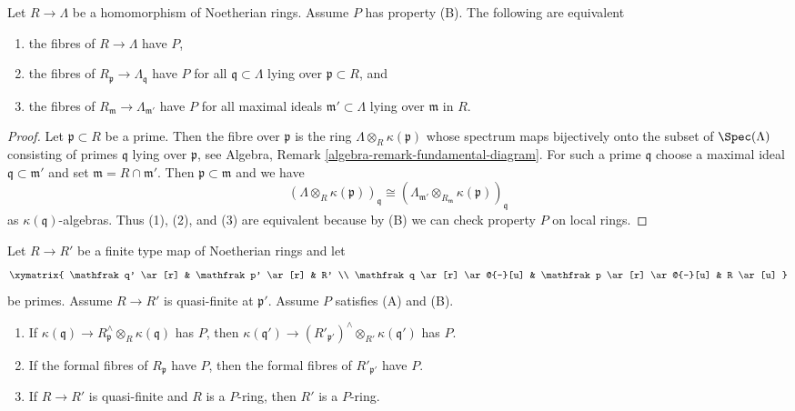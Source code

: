 \begin{lemma}
\label{lemma-P-local}
Let $R \to \Lambda$ be a homomorphism of Noetherian rings.
Assume $P$ has property (B). The following are equivalent
\begin{enumerate}
\item the fibres of $R \to \Lambda$ have $P$,
\item the fibres of $R_\mathfrak p \to \Lambda_\mathfrak q$ have $P$
for all $\mathfrak q \subset \Lambda$ lying over $\mathfrak p \subset R$, and
\item the fibres of $R_\mathfrak m \to \Lambda_{\mathfrak m'}$ have $P$
for all maximal ideals $\mathfrak m' \subset \Lambda$
lying over $\mathfrak m$ in $R$.
\end{enumerate}
\end{lemma}

\begin{proof}
Let $\mathfrak p \subset R$ be a prime. Then the fibre over
$\mathfrak p$ is the ring $\Lambda \otimes_R \kappa(\mathfrak p)$
whose spectrum maps bijectively onto the subset of $\Spec(\Lambda)$
consisting of primes $\mathfrak q$ lying over $\mathfrak p$, see
Algebra, Remark \ref{algebra-remark-fundamental-diagram}.
For such a prime $\mathfrak q$ choose a maximal
ideal $\mathfrak q \subset \mathfrak m'$ and set
$\mathfrak m = R \cap \mathfrak m'$.
Then $\mathfrak p \subset \mathfrak m$ and we have
$$
(\Lambda \otimes_R \kappa(\mathfrak p))_\mathfrak q \cong
(\Lambda_{\mathfrak m'} \otimes_{R_\mathfrak m}
\kappa(\mathfrak p))_\mathfrak q
$$
as $\kappa(\mathfrak q)$-algebras. Thus (1), (2), and (3) are equivalent
because by (B) we can check property $P$ on local rings.
\end{proof}

\begin{lemma}
\label{lemma-P-ring-goes-up-quasi-finite}
Let $R \to R'$ be a finite type map of Noetherian rings and let
$$
\xymatrix{
\mathfrak q' \ar[r] & \mathfrak p' \ar[r] & R' \\
\mathfrak q \ar[r] \ar@{-}[u] &
\mathfrak p \ar[r] \ar@{-}[u] & R \ar[u]
}
$$
be primes. Assume $R \to R'$ is quasi-finite at $\mathfrak p'$.
Assume $P$ satisfies (A) and (B).
\begin{enumerate}
\item If $\kappa(\mathfrak q) \to
R_\mathfrak p^\wedge \otimes_R \kappa(\mathfrak q)$
has $P$, then
$\kappa(\mathfrak q') \to
(R'_{\mathfrak p'})^\wedge \otimes_{R'} \kappa(\mathfrak q')$
has $P$.
\item If the formal fibres of $R_\mathfrak p$ have $P$,
then the formal fibres of $R'_{\mathfrak p'}$ have $P$.
\item If $R \to R'$ is quasi-finite and $R$ is a $P$-ring, then $R'$ is
a $P$-ring.
\end{enumerate}
\end{lemma}

